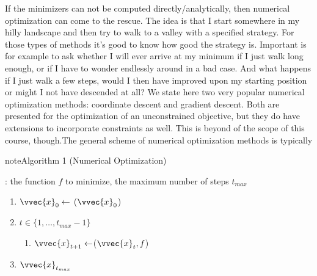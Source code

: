 \documentclass[letterpaper,10pt,english]{jupyterBook}
\begin{document}
\sphinxAtStartPar
If the minimizers can not be computed directly/analytically, then numerical optimization can come to the rescue. The idea is that I start somewhere in my hilly landscape and then try to walk to a valley with a specified strategy. For those types of methods it’s good to know how good the strategy is. Important is for example to ask whether I will ever arrive at my minimum if I just walk long enough, or if I have to wonder endlessly around in a bad case. And what happens if I just walk a few steps, would I then have improved upon my starting position or might I not have descended at all? We state here two very popular numerical optimization methods: coordinate descent and gradient descent. Both are presented for the optimization of an unconstrained objective, but they do have extensions to incorporate constraints as well. This is beyond of the scope of this course, though.The general scheme of numerical optimization methods is typically
\label{optimization_numerical:algorithm-0}
\begin{sphinxadmonition}{note}{Algorithm 1 (Numerical Optimization)}



\sphinxAtStartPar
{}: the function \(f\) to minimize, the maximum number of steps \(t_{max}\)
\begin{enumerate}
%
\item {} 
\sphinxAtStartPar
\(\vvec{x}_0\gets\) (\(\vvec{x}_0\))

\item {} 
\sphinxAtStartPar
{} \(t\in\{1,\ldots,t_{max}-1\}\)
\begin{enumerate}
%
\item {} 
\sphinxAtStartPar
\(\vvec{x}_{t+1}\gets \)(\(\vvec{x}_t,f\))

\end{enumerate}

\item {} 
\sphinxAtStartPar
{} \(\vvec{x}_{t_{max}}\)

\end{enumerate}
\end{sphinxadmonition}
\end{document}

